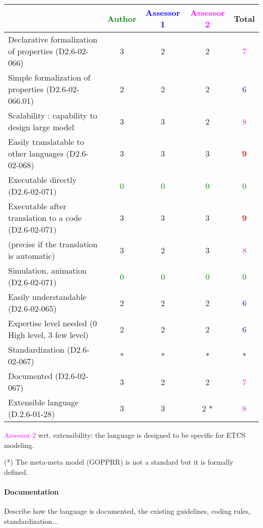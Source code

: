 \begin{tabular}{|l | c | c | c | c|}
  \hline
  & \textcolor{green}{Author} & \textcolor{blue}{Assessor 1} & \textcolor{magenta}{Assessor 2} & Total \\
  \hline
  Declarative formalization of properties (D2.6-02-066) &3 &2 & 2    & \textcolor{magenta}{7} \\
  \hline
  Simple formalization of properties (D2.6-02-066.01) &2 &2 & 2    & \textcolor{blue}{6} \\
  \hline
  Scalability : capability to design large model &3 &3 & 2    & \textcolor{magenta}{8} \\
  \hline
  Easily translatable to other languages (D2.6-02-068) &3 &3 & 3    & \textcolor{red}{\textbf{9}} \\
  \hline
  Executable directly (D2.6-02-071) & \textcolor{green}{0}   & \textcolor{green}{0}   & \textcolor{green}{0} & \textcolor{green}{0} \\
  \hline
  Executable after translation to a code (D2.6-02-071) &3 &3 & 3    & \textcolor{red}{\textbf{9}} \\
  (precise if the translation is automatic) &3 &2 & 3    & \textcolor{magenta}{8} \\
  \hline
  Simulation, animation (D2.6-02-071) & \textcolor{green}{0}   & \textcolor{green}{0}   & \textcolor{green}{0} & \textcolor{green}{0} \\
  \hline
  Easily understandable (D2.6-02-065) &2 &2 & 2    & \textcolor{blue}{6} \\
  \hline
  Expertise level needed (0 High level, 3 few level) &2 &2 & 2    & \textcolor{blue}{6} \\
  \hline
  Standardization (D2.6-02-067) &* &* & *& * \\
  \hline
  Documented (D2.6-02-067) &3 &2 & 2    & \textcolor{magenta}{7} \\
  \hline
  Extensible language (D.2.6-01-28) &3 &3 & 2    *& \textcolor{magenta}{8} \\
  \hline
\end{tabular}

\textcolor{magenta}{Assessor 2} wrt. extensibility: the language is designed to
be specific for ETCS modeling.

\begin{author_comment}
(*) The meta-meta model (GOPPRR) is not a standard but it is formally defined.
\end{author_comment}

\paragraph{Documentation} Describe how the language is documented, the existing guidelines, coding rules, standardization...

